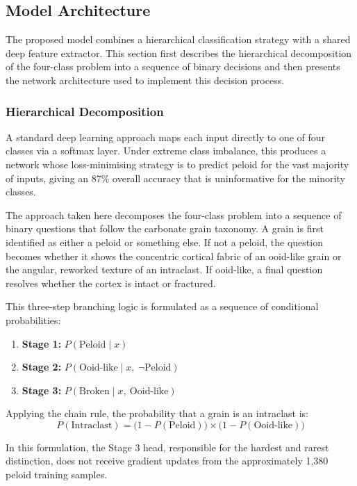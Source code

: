 \documentclass[a4paper,fleqn]{cas-dc}
\begin{document}
\subsection{Model Architecture}
The proposed model combines a hierarchical classification strategy with a shared deep feature extractor. This section first describes the hierarchical decomposition of the four-class problem into a sequence of binary decisions and then presents the network architecture used to implement this decision process.
\subsubsection{Hierarchical Decomposition}
A standard deep learning approach maps each input directly to one of four classes via a softmax layer. Under extreme class imbalance, this produces a network whose loss-minimising strategy is to predict peloid for the vast majority of inputs, giving an 87\% overall accuracy that is uninformative for the minority classes.

The approach taken here decomposes the four-class problem into a sequence of binary questions that follow the carbonate grain taxonomy. A grain is first identified as either a peloid or something else. If not a peloid, the question becomes whether it shows the concentric cortical fabric of an ooid-like grain or the angular, reworked texture of an intraclast. If ooid-like, a final question resolves whether the cortex is intact or fractured.

This three-step branching logic is formulated as a sequence of conditional probabilities:
\begin{enumerate}
  \item \textbf{Stage 1:} $P(\text{Peloid} \mid x)$
  \item \textbf{Stage 2:} $P(\text{Ooid-like} \mid x,\ \neg\text{Peloid})$
  \item \textbf{Stage 3:} $P(\text{Broken} \mid x,\ \text{Ooid-like})$
\end{enumerate}

Applying the chain rule, the probability that a grain is an intraclast is:
\begin{equation}
P(\text{Intraclast}) = \bigl(1 - P(\text{Peloid})\bigr) \times \bigl(1 - P(\text{Ooid-like})\bigr)
\end{equation}

In this formulation, the Stage 3 head, responsible for the hardest and rarest distinction, does not receive gradient updates from the approximately 1,380 peloid training samples.
\end{document}
